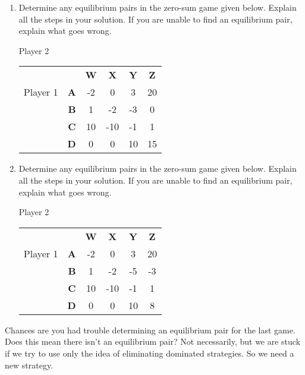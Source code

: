 \begin{enumerate}
\item Determine any equilibrium pairs in the zero-sum game given below.  Explain all the steps in your solution. If you are unable to find an equilibrium pair, explain what goes wrong.

\vspace{.1in}

\hspace{1in}Player 2

\begin{tabular}{l|r|c|c|c|c|}\cline{2-6}
&&\textbf{W}&\textbf{X}&\textbf{Y}&\textbf{Z}\\ \cline{2-6}
Player 1&\textbf{A} &-2&0&3&20\\ \cline{2-6}
&\textbf{B} &1&-2&-3&0\\ \cline{2-6}
&\textbf{C} &10&-10&-1&1\\ \cline{2-6}
&\textbf{D} &0&0&10&15\\ \cline{2-6}
\end{tabular}
\vspace{.2in}

\item Determine any equilibrium pairs in the zero-sum game given below.  Explain all the steps in your solution. If you are unable to find an equilibrium pair, explain what goes wrong.

\vspace{.1in}

\hspace{1in}Player 2

\begin{tabular}{l|r|c|c|c|c|}\cline{2-6}
&&\textbf{W}&\textbf{X}&\textbf{Y}&\textbf{Z}\\ \cline{2-6}
Player 1&\textbf{A} &-2&0&3&20\\ \cline{2-6}
&\textbf{B} &1&-2&-5&-3\\ \cline{2-6}
&\textbf{C} &10&-10&-1&1\\ \cline{2-6}
&\textbf{D} &0&0&10&8\\ \cline{2-6}
\end{tabular}
\vspace{.2in}




\end{enumerate}

Chances are you had trouble determining an equilibrium pair for the last game. Does this mean there isn't an equilibrium pair? Not necessarily, but we are stuck if we try to use only the idea of eliminating dominated strategies. So we need a new strategy. 

